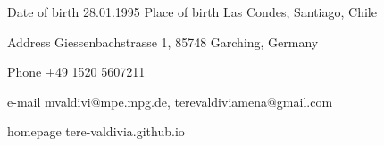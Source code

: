 \vspace{10pt}


\begin{cvskills}
	
	\cvskill
	{Date of birth} %
	{28.01.1995} %
	\cvskill
	{Place of birth} %
	{Las Condes, Santiago, Chile} %
	
	\cvskill
	{Address} %
	{Giessenbachstrasse 1, 85748 Garching, Germany} %
	
	\cvskill
	{Phone} %
	{+49 1520 5607211} %
	
	\cvskill
	{e-mail} %
	{mvaldivi@mpe.mpg.de, terevaldiviamena@gmail.com} %
	
	\cvskill
	{homepage} %
	{tere-valdivia.github.io} %
	
\end{cvskills}
